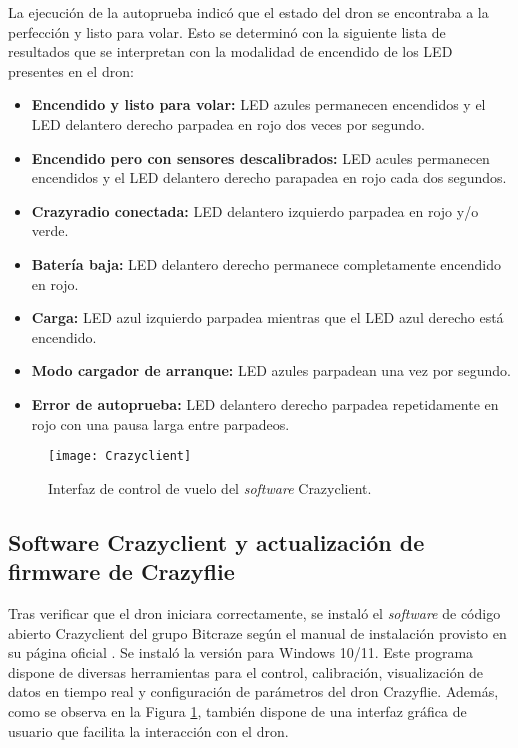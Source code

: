 La ejecución de la autoprueba indicó que el estado del dron se encontraba a la perfección y listo para volar. Esto se determinó con la siguiente lista de resultados que se interpretan con la modalidad de encendido de los LED presentes en el dron:
\begin{itemize}
	\item \textbf{Encendido y listo para volar:} LED azules permanecen encendidos y el LED delantero derecho parpadea en rojo dos veces por segundo.
	\item \textbf{Encendido pero con sensores descalibrados:} LED acules permanecen encendidos y el LED delantero derecho parapadea en rojo cada dos segundos.
	\item \textbf{Crazyradio conectada:} LED delantero izquierdo parpadea en rojo y/o verde.
	\item \textbf{Batería baja:} LED delantero derecho permanece completamente encendido en rojo.
	\item \textbf{Carga:} LED azul izquierdo parpadea mientras que el LED azul derecho está encendido.
	\item \textbf{Modo cargador de arranque:} LED azules parpadean una vez por segundo.
	\item \textbf{Error de autoprueba:} LED delantero derecho parpadea repetidamente en rojo con una pausa larga entre parpadeos.
\end{itemize}

\begin{figure}[htbp]
	\centering
	\texttt{[image: Crazyclient]}
	\caption{Interfaz de control de vuelo del \textit{software} Crazyclient.}
	\label{fig:Crazyclient}
\end{figure} 

\subsection{Software Crazyclient y actualización de firmware de Crazyflie}
Tras verificar que el dron iniciara correctamente, se instaló el \textit{software} de código abierto Crazyclient del grupo Bitcraze según el manual de instalación provisto en su página oficial \cite{Crazyflie_installation_Cfclient}. Se instaló la versión para Windows 10/11. Este programa dispone de diversas herramientas para el control, calibración, visualización de datos en tiempo real y configuración de parámetros del dron Crazyflie. Además, como se observa en la Figura \ref{fig:Crazyclient}, también dispone de una interfaz gráfica de usuario que facilita la interacción con el dron.

